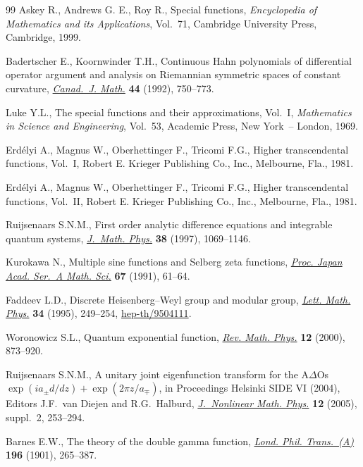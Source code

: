 \documentclass[pdftex]{sigma}
\numberwithin{equation}{section}
\begin{document}
\begin{thebibliography}{99}
Askey R., Andrews G. E.,  Roy R.,
Special functions,
{\it Encyclopedia of Mathematics and its Applications}, Vol.~71, Cambridge University Press, Cambridge, 1999.

Badertscher E., Koornwinder T.H.,
Continuous Hahn polynomials of dif\/ferential operator argument and analysis on Riemannian symmetric spaces of constant curvature,
\href{http://dx.doi.org/10.4153/CJM-1992-044-4}{{\it Canad.~J. Math.}} {\bf 44} (1992), 750--773.

Luke Y.L.,
The special functions and their approximations,
Vol.~I, {\it Mathematics in Science and Engineering}, Vol.~53, Academic Press, New York~-- London, 1969.

Erd\'elyi A., Magnus W., Oberhettinger  F., Tricomi  F.G.,
Higher transcendental functions, Vol.~I, Robert E. Krieger Publishing Co., Inc., Melbourne, Fla., 1981.

Erd\'elyi A., Magnus W., Oberhettinger  F., Tricomi  F.G.,
Higher transcendental functions, Vol.~II, Robert E. Krieger Publishing Co., Inc., Melbourne, Fla., 1981.

Ruijsenaars S.N.M.,
First order analytic dif\/ference equations and integrable quantum systems,
\href{http://dx.doi.org/10.1063/1.531809}{{\it  J.~Math. Phys.}} {\bf 38} (1997),  1069--1146.

Kurokawa N.,
Multiple sine functions and Selberg zeta functions,
\href{http://dx.doi.org/10.3792/pjaa.67.61}{{\it Proc. Japan Acad. Ser.~A Math. Sci.}} {\bf 67} (1991), 61--64.

Faddeev L.D.,
Discrete Heisenberg--Weyl group and modular group,
\href{http://dx.doi.org/10.1007/BF01872779}{{\it Lett. Math. Phys.}} {\bf 34} (1995), 249--254,
\href{http://arxiv.org/abs/hep-th/9504111}{hep-th/9504111}.

Woronowicz S.L.,
Quantum exponential function,
\href{http://dx.doi.org/10.1142/S0129055X00000344}{{\it Rev. Math. Phys.}} {\bf 12} (2000), 873--920.

Ruijsenaars S.N.M.,
A unitary joint eigenfunction transform for the A$\Delta$Os $\exp(ia_{\pm}d/dz)+\exp(2\pi z/a_{\mp})$,
in Proceedings Helsinki SIDE VI (2004), Editors J.F.~van Diejen and R.G.~Halburd,
\href{http://dx.doi.org/10.2991/jnmp.2005.12.s2.19}{{\it J.~Nonlinear Math. Phys.}}  {\bf 12} (2005), suppl.~2,
253--294.


Barnes E.W.,
The theory of the double gamma function,
\href{http://dx.doi.org/10.1098/rsta.1901.0006}{{\it Lond. Phil. Trans.~(A)}} {\bf 196} (1901), 265--387.


\end{thebibliography}
\end{document}
